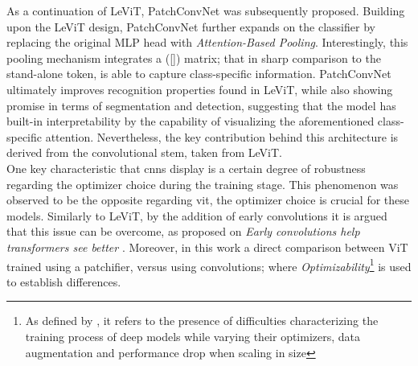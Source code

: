 \noindent As a continuation of LeViT, PatchConvNet \autocite{touvron2021augmenting} was subsequently 
proposed. Building upon the LeViT design, PatchConvNet further expands on the classifier by 
replacing the original MLP head with \emph{Attention-Based Pooling}. Interestingly, this 
pooling mechanism integrates a ([]) matrix; that in sharp comparison to the stand-alone 
token, is able to capture class-specific information. PatchConvNet ultimately improves  
recognition properties found in LeViT, while also showing promise in terms of segmentation and 
detection, suggesting that the model has built-in interpretability by the capability of 
visualizing the aforementioned class-specific attention. Nevertheless, the key contribution 
behind this architecture is derived from the convolutional stem, taken from LeViT.\\ 

\noindent One key characteristic that \glspl{cnn} display is a certain degree of robustness 
regarding the optimizer choice during the training stage. This phenomenon was 
observed to be the opposite regarding \gls{vit}, the optimizer choice is crucial for these 
models. Similarly to LeViT, by the addition of early convolutions it is argued that 
this issue can be overcome, as proposed on \emph{Early convolutions help transformers see 
better} \autocite{xiao2021early}. Moreover, in this work a direct comparison between ViT trained 
using a patchifier, versus using convolutions; where \emph{Optimizability}\footnote{As defined by 
\cite{xiao2021early}, it refers to the presence of difficulties characterizing the training 
process of deep models while varying their optimizers, data augmentation and performance drop 
when scaling in size} is used to establish differences.\\

